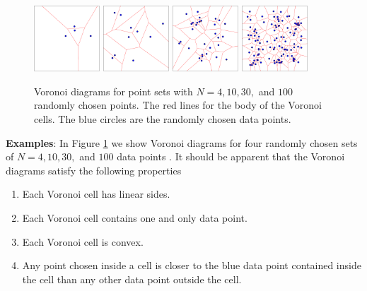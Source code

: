 \begin{figure}[htbp!]
    \centering
    \includegraphics[width=0.22\textwidth]{figures/kmeans/voronoiRand4-crop.pdf}
    \includegraphics[width=0.22\textwidth]{figures/kmeans/voronoiRand10-crop.pdf}
    \includegraphics[width=0.22\textwidth]{figures/kmeans/voronoiRand30-crop.pdf}
    \includegraphics[width=0.22\textwidth]{figures/kmeans/voronoiRand100-crop.pdf}
    \caption{Voronoi diagrams for point sets with $N=4,10,30,$ and $100$ randomly chosen points. The red lines for the body of the Voronoi cells. The blue circles are the randomly chosen data points. }
    \label{voronoiExamples.fig}
\end{figure}

{\bf Examples}: In Figure \ref{voronoiExamples.fig} we show Voronoi diagrams for four randomly chosen sets of $N=4,10,30,$ and $100$ data points . It should be apparent that the Voronoi diagrams satisfy the following properties

\begin{enumerate}
\item Each Voronoi cell has linear sides.
\item Each Voronoi cell contains one and only data point. 
\item Each Voronoi cell is convex.
\item Any point chosen inside a cell is closer to the blue data point contained inside the cell than any other data point outside the cell.
\end{enumerate}


